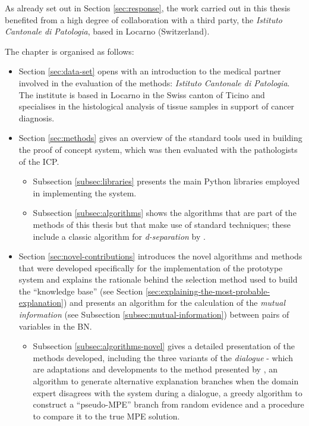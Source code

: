  As already set out in Section \ref{sec:response}, the work carried out in this thesis benefited from a high degree of collaboration with a third party, the \textit{Istituto Cantonale di Patologia}, based in Locarno (Switzerland).

 The chapter is organised as follows:
 \begin{itemize}
  	\item Section \ref{sec:data-set} opens with an introduction to the medical partner involved in the evaluation of the methods: \textit{Istituto Cantonale di Patologia}. The institute is based in Locarno in the Swiss canton of Ticino and specialises in the histological analysis of tissue samples in support of cancer diagnosis.
 	\item Section \ref{sec:methods} gives an overview of the standard tools used in building the proof of concept system, which was then evaluated with the pathologists of the ICP.
 	\begin{itemize}
  		\item Subsection \ref{subsec:libraries} presents the main Python libraries employed in implementing the system.
  		\item Subsection \ref{subsec:algorithms} shows the algorithms that are part of the methods of this thesis but that make use of standard techniques; these include a classic algorithm for \textit{d-separation} by \citet{koller2007}.	
	\end{itemize}
	\item Section \ref{sec:novel-contributions} introduces the novel algorithms and methods that were developed specifically for the implementation of the prototype system and explains the rationale behind the selection method used to build the \enquote{knowledge base} (see Section \ref{sec:explaining-the-most-probable-explanation}) and presents an algorithm for the calculation of the \textit{mutual information} (see Subsection \ref{subsec:mutual-information}) between pairs of variables in the BN.
	\begin{itemize}
  		\item Subsection \ref{subsec:algorithms-novel} gives a detailed presentation of the methods developed, including the three variants of the \textit{dialogue} - which are adaptations and developments to the method presented by \citet{Butz2018}, an algorithm to generate alternative explanation branches when the domain expert disagrees with the system during a dialogue, a greedy algorithm to construct a \enquote{pseudo-MPE} branch from random evidence and a procedure to compare it to the true MPE solution.

\end{itemize}
\end{itemize}
